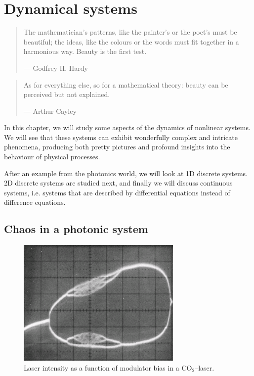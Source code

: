 \setcounter{chapter}{4} %

\chapter{Dynamical systems}
\label{h:dynamical}

\begin{quote}
The mathematician's patterns, like the painter's or the poet's must be beautiful; the ideas, like the colours or the words must fit together in a harmonious way. Beauty is the first test.

--- Godfrey H. Hardy
\end{quote}

\begin{quote}
As for everything else, so for a mathematical theory: beauty can be perceived but not explained.

--- Arthur Cayley
\end{quote}

\minitoc

In this chapter, we will study some aspects of the dynamics of nonlinear systems. We will see that these systems can exhibit wonderfully complex and intricate phenomena, producing both pretty pictures and profound insights into the behaviour of physical processes.

After an example from the photonics world, we will look at 1D discrete systems. 2D discrete systems are studied next, and finally we will discuss continuous systems, i.e. systems that are described by differential equations instead of difference equations.

\section{Chaos in a photonic system}

\begin{figure}
\centering
\includegraphics[width=8cm]{dynamic/figures/CO2_chaos}
\caption{Laser intensity as a function of modulator bias in a CO$_2$--laser.}
\label{fig-co2}
\end{figure}

